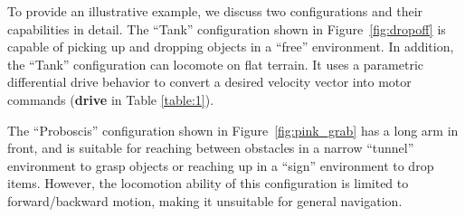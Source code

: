 \documentclass[conference]{IEEEtran}
\begin{document}
To provide an illustrative example, we discuss two configurations and their capabilities in detail.
The ``Tank'' configuration shown in Figure~\ref{fig:dropoff} is capable of picking
up and dropping objects in a ``free'' environment. In addition, the ``Tank'' configuration can locomote on flat terrain. It uses a parametric differential drive behavior to convert a desired velocity vector into motor commands (\textbf{drive} in Table \ref{table:1}).

The ``Proboscis'' configuration shown in Figure~\ref{fig:pink_grab} has
a long arm in front, and is suitable for reaching between obstacles in a narrow ``tunnel'' environment to grasp objects or reaching up in a ``sign'' environment to drop items.
However, the locomotion ability of this configuration is limited to forward/backward
motion, making it unsuitable for general navigation.
\end{document}
